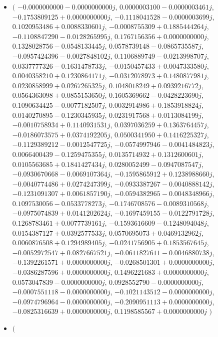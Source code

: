 \documentclass[14pt,a4paper]{article}
\begin{document}
\begin{itemize}
\item
$\big($
$-0.0000000000-0.0000000000j$, $0.0000003100-0.0000003461j$, $-0.1753809125+0.0000000000j$, $-0.1118041528-0.0000003699j$, $0.1020953486+0.0088330601j$, $-0.0008755309+0.1885444264j$, $-0.1108847290-0.0128265995j$, $0.1767156356+0.0000000000j$, $0.1328028756-0.0548133445j$, $0.0578739148-0.0865735587j$, $-0.0957424396-0.0027848102j$, $0.1106889749-0.0213998707j$, $0.0337777326-0.1631478733j$, $-0.0150457433+0.0047333580j$, $0.0040358210+0.1230864171j$, $-0.0312078973+0.1480877981j$, $0.0230858999+0.0267265325j$, $0.1048018249+0.0939216772j$, $0.0564363098+0.0855153650j$, $0.1605369662-0.0428223690j$, $0.1090634425-0.0077182507j$, $0.0032914986+0.1853918824j$, $0.0140270895-0.1230345935j$, $0.0231917568+0.0113084199j$, $-0.0010758934+0.1140931531j$, $0.0397036259+0.1363764457j$, $-0.0186073575+0.0374192205j$, $0.0500341950+0.1416225327j$, $-0.1129389212-0.0012547725j$, $-0.0574997946-0.0041484823j$, $0.0066400439-0.1259475355j$, $0.0135714932+0.1312600601j$, $0.0105563685+0.1841427434j$, $0.0280052499-0.0947087547j$, $-0.0930670668-0.0069107364j$, $-0.1595865912+0.1238988660j$, $-0.0040774486+0.0274247399j$, $-0.0933387267-0.0040888142j$, $-0.1231091307+0.0061857190j$, $-0.0594382965-0.0048348966j$, $0.1097530056-0.0533778273j$, $-0.1746708576-0.0089310568j$, $-0.0975074839+0.0141202624j$, $-0.1697459155-0.0122791728j$, $0.1268783461+0.0077739161j$, $-0.1593616609-0.1248094048j$, $0.0154387127+0.0392577533j$, $0.0570695073+0.0469132962j$, $0.0060876508+0.1294989405j$, $-0.0241756905+0.1853567645j$, $-0.0052972547+0.0827667521j$, $-0.0611827611-0.0046880738j$, $-0.1392261571+0.0000000000j$, $-0.0268501301+0.0000000000j$, $-0.0386287596+0.0000000000j$, $0.1496221683+0.0000000000j$, $0.0573047839-0.0000000000j$, $0.0928552790-0.0000000000j$, $-0.0007551118-0.0000000000j$, $-0.1021143512-0.0000000000j$, $-0.0974796964-0.0000000000j$, $-0.2090951113+0.0000000000j$, $-0.0825316639+0.0000000000j$, $0.1198585567+0.0000000000j$
$\big)$
\item
$\big($

\end{itemize}
\end{document}

